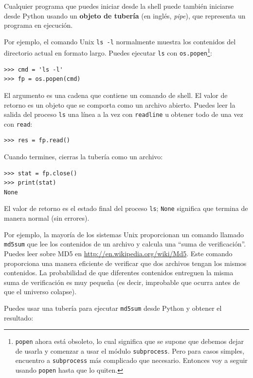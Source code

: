 \documentclass[10pt]{book}
\begin{document}
Cualquier programa que puedes iniciar desde la shell puede también
iniciarse desde Python usando un {\bf objeto de tubería} (en inglés, {\em pipe}), que
representa un programa en ejecución.

Por ejemplo, el comando Unix {\tt ls -l} normalmente muestra los
contenidos del directorio actual en formato largo.  Puedes
ejecutar {\tt ls} con {\tt os.popen}\footnote{{\tt popen} ahora está
obsoleto, lo cual significa que se supone que debemos dejar de usarla y comenzar a usar
el módulo {\tt subprocess}.  Pero para casos simples, encuentro a
{\tt subprocess} más complicado que necesario.  Entonces voy a
seguir usando {\tt popen} hasta que lo quiten.}:

\begin{verbatim}
>>> cmd = 'ls -l'
>>> fp = os.popen(cmd)
\end{verbatim}
%
El argumento es una cadena que contiene un comando de shell.  El
valor de retorno es un objeto que se comporta como un archivo
abierto.  Puedes leer la salida del proceso {\tt ls} una
línea a la vez con {\tt readline} u obtener todo de una vez
con {\tt read}:

\begin{verbatim}
>>> res = fp.read()
\end{verbatim}
%
Cuando termines, cierras la tubería como un archivo:

\begin{verbatim}
>>> stat = fp.close()
>>> print(stat)
None
\end{verbatim}
%
El valor de retorno es el estado final del proceso {\tt ls};
{\tt None} significa que termina de manera normal (sin errores).

Por ejemplo, la mayoría de los sistemas Unix proporcionan un comando llamado {\tt md5sum}
que lee los contenidos de un archivo y calcula una ``suma de verificación''.
Puedes leer sobre MD5 en \url{http://en.wikipedia.org/wiki/Md5}.  Este
comando proporciona una manera eficiente de verificar que dos archivos
tengan los mismos contenidos.  La probabilidad de que diferentes contenidos
entreguen la misma suma de verificación es muy pequeña (es decir, improbable que ocurra
antes de que el universo colapse).

Puedes usar una tubería para ejecutar {\tt md5sum} desde Python y obtener el resultado:
\end{document}

